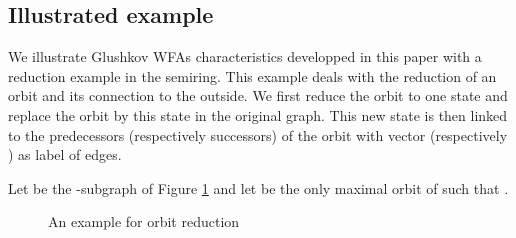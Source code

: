 \documentclass[11pt]{article}
\begin{document}
\subsection*{Illustrated example}

We illustrate Glushkov WFAs characteristics developped in this paper  with a reduction example in the  semiring. This example deals with the reduction of an orbit and its connection to the outside. We first reduce the orbit to one state and replace the orbit by this state in the original graph. This new state is then linked to the predecessors (respectively successors) of the orbit with vector  (respectively ) as label of edges.

Let  be the -subgraph of Figure \ref{fig-example} and let  be the only maximal orbit of  such that .




\begin{figure}[H]
\caption{An example for orbit reduction}\label{fig-example}
\end{figure}
\end{document}
